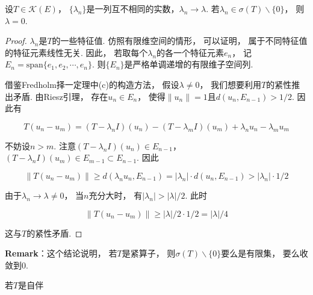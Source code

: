 \begin{lemma}
    设$T \in \mathcal{K}(E)$，
    $\{\lambda_n\}$是一列互不相同的实数，$\lambda_n \to \lambda$.
    若$\lambda_n \in \sigma(T) \backslash \{0\}$，
    则$\lambda = 0$.
\end{lemma}

\begin{proof}
    $\lambda_n$是$T$的一些特征值.
    仿照有限维空间的情形，
    可以证明，
    属于不同特征值的特征元素线性无关.
    因此，
    若取每个$\lambda_n$的各一个特征元素$e_n$，
    记$E_n = \mathrm{span} \{ e_1 , e_2, \cdots , e_n \}$.
    则$\{E_n \}$是严格单调递增的有限维子空间列.

    借鉴Fredholm择一定理中(c)的构造方法，
    假设$\lambda \ne 0$，
    我们想要利用$T$的紧性推出矛盾.
    由Riesz引理，
    存在$u_n \in E_n$，
    使得$\|u_n\| = 1$且$d(u_n, E_{n-1}) > 1/2$.
    因此有

    \[
    T(u_n - u_m) = (T - \lambda_n I)(u_n) - (T - \lambda_m I)(u_m) + \lambda_n u_n - \lambda_m u_m
    \]

    不妨设$n > m$.
    注意$(T - \lambda_n I) (u_n) \in E_{n-1}$，
    $(T - \lambda_n I) (u_m) \in E_{m-1} \subset E_{n-1}$.
    因此

    \[
    \| T(u_n - u_m) \| \ge d(\lambda_n u_n , E_{n-1})
    = |\lambda_n| \cdot d(u_n, E_{n-1}) > |\lambda_n| \cdot 1/2
    \]

    由于$\lambda_n \to \lambda \ne 0$，
    当$n$充分大时，
    有$|\lambda_n| > |\lambda|/2$.
    此时

    \[
    \| T(u_n - u_m) \| \ge |\lambda|/2 \cdot 1/2 = |\lambda|/4
    \]

    这与$T$的紧性矛盾.
\end{proof}

\begin{remarkbox}
    \textbf{Remark}：这个结论说明，
    若$T$是紧算子，
    则$\sigma (T) \backslash \{0\}$要么是有限集，
    要么收敛到$0$.
\end{remarkbox}


\begin{theorem}[谱分解定理]
    若$T$是自伴
\end{theorem}


